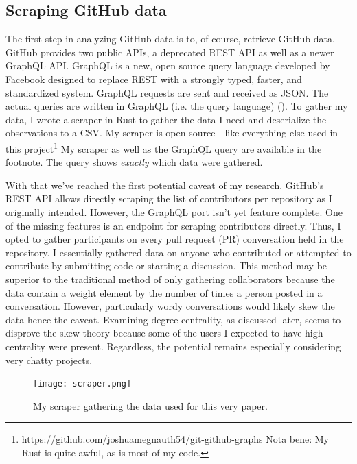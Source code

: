 \documentclass[12pt, a4paper]{article}
\begin{document}
\subsection{Scraping GitHub data}
The first step in analyzing GitHub data is to, of course, retrieve GitHub data. GitHub provides two public APIs, a deprecated REST API as well as a newer GraphQL API. GraphQL is a new, open source query language developed by Facebook designed to replace REST with a strongly typed, faster, and standardized system. GraphQL requests are sent and received as JSON. The actual queries are written in GraphQL (i.e. the query language) (\cite{graphql}). To gather my data, I wrote a scraper in Rust to gather the data I need and deserialize the observations to a CSV. My scraper is open source---like everything else used in this project\footnote{https://github.com/joshuamegnauth54/git-github-graphs Nota bene: My Rust is quite awful, as is most of my code.} My scraper as well as the GraphQL query are available in the footnote. The query shows \textit{exactly} which data were gathered.

With that we've reached the first potential caveat of my research. GitHub's REST API allows directly scraping the list of contributors per repository as I originally intended. However, the GraphQL port isn't yet feature complete. One of the missing features is an endpoint for scraping contributors directly. Thus, I opted to gather participants on every pull request (PR) conversation held in the repository. I essentially gathered data on anyone who contributed or attempted to contribute by submitting code or starting a discussion. This method may be superior to the traditional method of only gathering collaborators because the data contain a weight element by the number of times a person posted in a conversation. However, particularly wordy conversations would likely skew the data hence the caveat. Examining degree centrality, as discussed later, seems to disprove the skew theory because some of the users I expected to have high centrality were present. Regardless, the potential remains especially considering very chatty projects.

\begin{figure}[ht!]
    \texttt{[image: scraper.png]}
    \caption{My scraper gathering the data used for this very paper.}
    \label{fig:scraper}
\end{figure}
\end{document}

